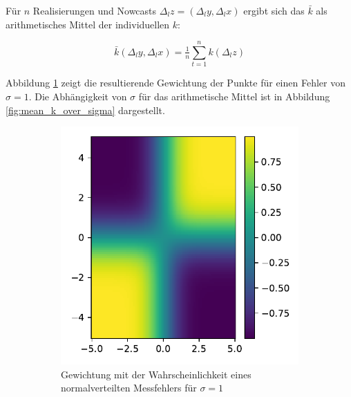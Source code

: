\documentclass{article}
\theoremstyle{plain}%
\theoremstyle{definition}
\newcommand{\lag}[1][l]{\Delta_{#1}}
\begin{document}

Für $n$ Realisierungen und Nowcasts $\lag z = (\lag y, \lag x)$ ergibt sich das $\bar{k}$ als arithmetisches Mittel der individuellen $k$:

\begin{equation}
  \bar{k}(\lag y, \lag x) = \tfrac{1}{n} \sum_{t=1}^n k(\lag z)
\end{equation}


Abbildung \ref{fig:weighting} zeigt die resultierende Gewichtung der Punkte für einen Fehler von $\sigma = 1$.
Die Abhängigkeit von $\sigma$ für das arithmetische Mittel ist in Abbildung \ref{fig:mean_k_over_sigma} dargestellt.

\begin{figure}
  	\centering
  	\begin{subfigure}{.48\textwidth}
	    \includegraphics[width = \textwidth]{plots/weight_by_probability.pdf}
		\caption{Gewichtung mit der Wahrscheinlichkeit eines normalverteilten Messfehlers für $\sigma = 1$}
  		\label{fig:weighting}	
  	\end{subfigure}
	\begin{subfigure}{.48\textwidth}

\end{subfigure}
\end{figure}
\end{document}
